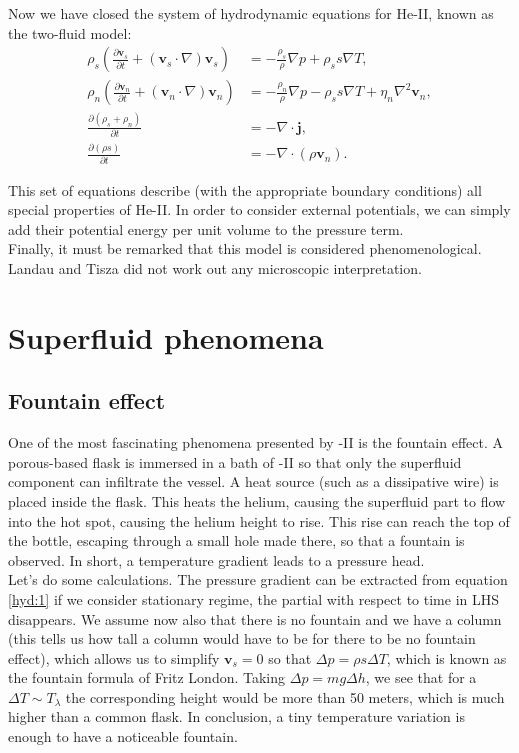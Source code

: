 \documentclass{article}
\begin{document}
Now we have closed the system of hydrodynamic equations for He-II, known as the two-fluid model:
\begin{align}
\rho_s \left( \frac{\partial \mathbf{v}_s}{\partial t} + (\mathbf{v}_s \cdot \nabla) \mathbf{v}_s \right) &= -\frac{\rho_s}{\rho} \nabla p + \rho_s s \nabla T, \label{hyd:1} \\
\rho_n \left( \frac{\partial \mathbf{v}_n}{\partial t} + (\mathbf{v}_n \cdot \nabla) \mathbf{v}_n \right) &= -\frac{\rho_n}{\rho} \nabla p - \rho_s s \nabla T + \eta_n \nabla^2 \mathbf{v}_n, \label{hyd:2}  \\
\frac{\partial (\rho_s + \rho_n)}{\partial t} &= -\nabla \cdot \mathbf{j}, \label{hyd:3} \\
\frac{\partial (\rho s)}{\partial t} &= -\nabla \cdot (\rho \mathbf{v}_n). \label{hyd:4} 
\end{align}

This set of equations describe (with the appropriate boundary conditions) all special properties of He-II\@. In order to consider external potentials, we can simply add their potential energy per unit volume to the pressure term. 
\\

Finally, it must be remarked that this model is considered phenomenological. Landau and Tisza did not work out any microscopic interpretation. 

\section{Superfluid phenomena}

\subsection{Fountain effect}


One of the most fascinating phenomena presented by -II is the fountain effect. A porous-based flask is immersed in a bath of -II so that only the superfluid component can infiltrate the vessel. A heat source (such as a dissipative wire) is placed inside the flask. This heats the helium, causing the superfluid part to flow into the hot spot, causing the helium height to rise. This rise can reach the top of the bottle, escaping through a small hole made there, so that a fountain is observed. In short, a temperature gradient leads to a pressure head.
\\

Let's do some calculations. The pressure gradient can be extracted from equation \eqref{hyd:1} if we consider stationary regime, the partial with respect to time in LHS disappears. We assume now also that there is no fountain and we have a column (this tells us how tall a column would have to be for there to be no fountain effect), which allows us to simplify $\mathbf{v}_s = 0$ so that $\Delta p = \rho s \Delta T$, which is known as the fountain formula of Fritz London. Taking $\Delta p = mg \Delta h$, we see that for a $\Delta T \sim T_\lambda$ the corresponding height would be more than 50 meters, which is much higher than a common flask. In conclusion, a tiny temperature variation is enough to have a noticeable fountain.
\end{document}
